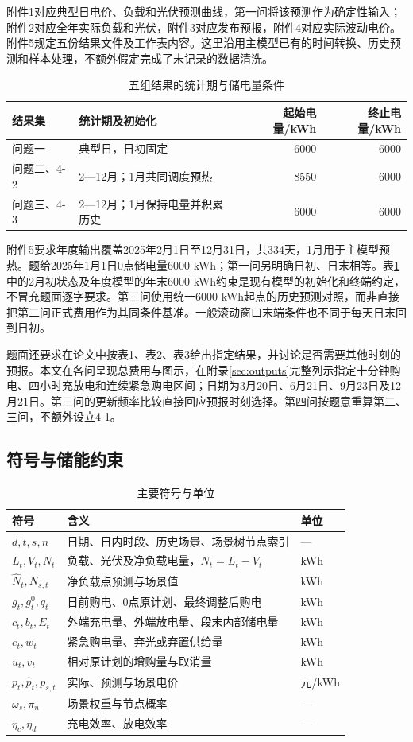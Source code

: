 附件1对应典型日电价、负载和光伏预测曲线，第一问将该预测作为确定性输入；附件2对应全年实际负载和光伏，附件3对应发布预报，附件4对应实际波动电价。附件5规定五份结果文件及工作表内容。这里沿用主模型已有的时间转换、历史预测和样本处理，不额外假定完成了未记录的数据清洗。

\begin{table}[htbp]\centering\small
\caption{五组结果的统计期与储电量条件}\label{tab:conditions}
\begin{tabularx}{\linewidth}{l X r r}
\toprule 结果集 & 统计期及初始化 & 起始电量/kWh & 终止电量/kWh\\\midrule
问题一 & 典型日，日初固定 & 6000 & 6000\\
问题二、4-2 & 2—12月；1月共同调度预热 & 8550 & 6000\\
问题三、4-3 & 2—12月；1月保持电量并积累历史 & 6000 & 6000\\
\bottomrule\end{tabularx}\end{table}

附件5要求年度输出覆盖2025年2月1日至12月31日，共334天，1月用于主模型预热。题给2025年1月1日0点储电量6000 kWh；第一问另明确日初、日末相等。表\ref{tab:conditions}中的2月初状态及年度模型的年末6000 kWh约束是现有模型的初始化和终端约定，不冒充题面逐字要求。第三问使用统一6000 kWh起点的历史预测对照，而非直接把第二问正式费用作为其同条件基准。一般滚动窗口末端条件也不同于每天日末回到日初。

题面还要求在论文中按表1、表2、表3给出指定结果，并讨论是否需要其他时刻的预报。本文在各问呈现总费用与图示，在附录\ref{sec:outputs}完整列示指定十分钟购电、四小时充放电和连续紧急购电区间；日期为3月20日、6月21日、9月23日及12月21日。第三问的更新频率比较直接回应预报时刻选择。第四问按题意重算第二、三问，不额外设立4-1。

\subsection{符号与储能约束}
\begin{table}[htbp]\centering\small
\caption{主要符号与单位}
\begin{tabularx}{\linewidth}{l X l}\toprule
符号 & 含义 & 单位\\\midrule
$d,t,s,n$ & 日期、日内时段、历史场景、场景树节点索引 & —\\
$L_t,V_t,N_t$ & 负载、光伏及净负载电量，$N_t=L_t-V_t$ & kWh\\
$\widehat N_t,N_{s,t}$ & 净负载点预测与场景值 & kWh\\
$g_t,g_t^0,q_t$ & 日前购电、0点原计划、最终调整后购电 & kWh\\
$c_t,b_t,E_t$ & 外端充电量、外端放电量、段末内部储电量 & kWh\\
$e_t,w_t$ & 紧急购电量、弃光或弃置供给量 & kWh\\
$u_t,v_t$ & 相对原计划的增购量与取消量 & kWh\\
$p_t,\widehat p_t,p_{s,t}$ & 实际、预测与场景电价 & 元/kWh\\
$\omega_s,\pi_n$ & 场景权重与节点概率 & —\\
$\eta_c,\eta_d$ & 充电效率、放电效率 & —\\
\bottomrule\end{tabularx}\end{table}

